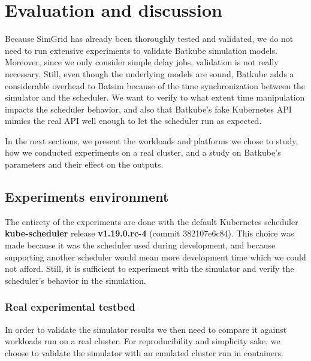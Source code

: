 
\chapter{Evaluation and discussion}

Because SimGrid has already been thoroughly tested and validated, we do not
need to run extensive experiments to validate Batkube simulation models.
Moreover, since we only consider simple delay jobs, validation is not really
necessary. Still, even though the underlying models are sound, Batkube adds a
considerable overhead to Batsim because of the time synchronization between the
simulator and the scheduler. We want to verify to what extent time manipulation
impacts the scheduler behavior, and also that Batkube's fake Kubernetes API
mimics the real API well enough to let the scheduler run as expected.

In the next sections, we present the workloads and platforms we chose to study,
how we conducted experiments on a real cluster, and a study on Batkube's
parameters and their effect on the outputs.

\section{Experiments environment}

The entirety of the experiments are done with the default Kubernetes scheduler
\textbf{kube-scheduler} release \textbf{v1.19.0.rc-4} (commit 382107e6c84).
This choice was made because it was the scheduler used during development, and
because supporting another scheduler would mean more development time which we
could not afford. Still, it is sufficient to experiment with the simulator and
verify the scheduler's behavior in the simulation.

\subsection{Real experimental testbed}

In order to validate the simulator results we then need to compare it against
workloads run on a real cluster. For reproducibility and simplicity sake, we
choose to validate the simulator with an emulated cluster run in
containers.\\

